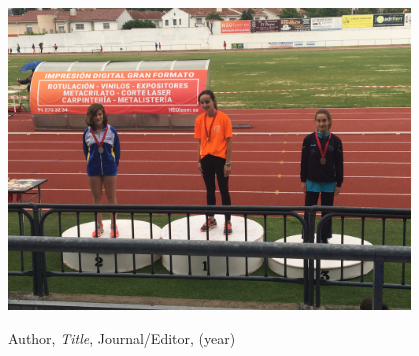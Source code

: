 \documentclass[12pt,a4paper]{article}
\theoremstyle{definition}
\theoremstyle{remark}
\begin{document}
\includegraphics[width=0.8\textwidth]{./figs/picture.JPG}


\begin{thebibliography}{99}

 Author, \emph{Title}, Journal/Editor, (year)

\end{thebibliography}
\end{document}
